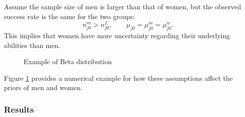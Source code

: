 \documentclass[10 pt]{article}
\newcommand{\pr}[1]{\left( #1 \right)}
\begin{document}
\begin{blist}
\item
Assume the sample size of men is larger than that of women, but the observed success rate is the same for the two groups:
\begin{equation*}
  n_{j0}^m > n_{j0}^f, \quad \quad \mu_{j0} = \mu_{j0}^m = \mu_{j0}^w.
\end{equation*}
This implies that women have more uncertainty regarding their underlying abilities than men.  
\begin{figure}[htb]
\begin{center}

\end{center}
\caption{Example of Beta distribution}
\label{beta_distribution}
\end{figure}
Figure \ref{beta_distribution} provides a numerical example for how these assumptions affect the priors of men and women. 






\end{blist}

\subsubsection{Results}
\end{document}
